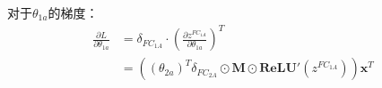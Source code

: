 \begin{solution}
\begin{enumerate}
        对于$\theta_{1a}$的梯度：
        \begin{align*}
            \frac{\partial L}{\partial \theta_{1a}} &= \delta_{FC_{1A}} \cdot \left(\frac{\partial z^{FC_{1A}}}{\partial \theta_{1a}}\right)^T \\
            &= \left((\theta_{2a})^T \delta_{FC_{2A}} \odot \textbf{M} \odot \textbf{ReLU}'(z^{FC_{1A}})\right)\bm{x}^T
        \end{align*}


    \end{enumerate}
\end{solution}